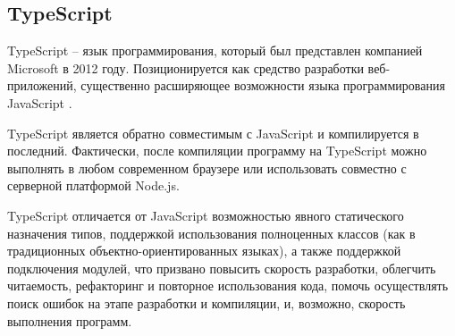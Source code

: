 \subsection{TypeScript}

TypeScript – язык программирования, который был представлен компанией Microsoft в 2012 году. Позиционируется как средство разработки веб-приложений, существенно расширяющее возможности языка программирования JavaScript \cite{typescript}.

TypeScript является обратно совместимым с JavaScript и компилируется в последний. Фактически, после компиляции программу на TypeScript можно выполнять в любом современном браузере или использовать совместно с серверной платформой Node.js.

TypeScript отличается от JavaScript возможностью явного статического назначения типов, поддержкой использования полноценных классов (как в традиционных объектно-ориентированных языках), а также поддержкой подключения модулей, что призвано повысить скорость разработки, облегчить читаемость, рефакторинг и повторное использования кода, помочь осуществлять поиск ошибок на этапе разработки и компиляции, и, возможно, скорость выполнения программ.
